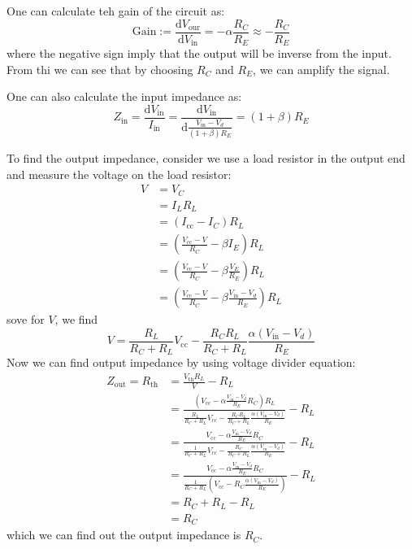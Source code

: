 \documentclass[aps,prl,reprint]{revtex4-1}
\newcommand{\de}{\mathrm{d}}
\newcommand{\vcc}{V_\text{cc}}
\begin{document}
One can calculate teh gain of the circuit as:
\begin{equation*}
    \text{Gain}:=\frac{\de V_\text{our}}{\de V_\text{in}} = -\alpha\frac{R_C}{R_E} \approx -\frac{R_C}{R_E}
\end{equation*}
where the negative sign imply that the output will be inverse from the input. From thi we can see that by choosing $R_C$ and $R_E$, we can amplify the signal.

One can also calculate the input impedance as:
\[
Z_\text{in} = \frac{\de V_\text{in}}{I_\text{in}}=\frac{\de V_\text{in}}{\de \frac{V_\text{in} - V_d}{(1+\beta)R_E}} = (1+\beta)R_E
\]

To find the output impedance, consider we use a load resistor in the output end and measure the voltage on the load resistor:
\begin{align*}
    V &= V_C\\
      &=I_LR_L \\
      &= (I_\text{cc} - I_C)R_L\\
      &= (\frac{\vcc-V}{R_C}-\beta I_E)R_L\\
      &= (\frac{\vcc-V}{R_C}-\beta \frac{V_E}{R_E})R_L \\
      &= (\frac{\vcc-V}{R_C}-\beta \frac{V_\text{in} - V_d}{R_E})R_L
\end{align*}
sove for $V$, we find
\[
V = \frac{R_L}{R_C+R_L} \vcc - \frac{R_CR_L}{R_C+R_L}\frac{\alpha (V_\text{in}-V_d)}{R_E}
\]
Now we can find output impedance by using voltage divider equation:
\begin{align*}
    Z_\text{out} = R_\text{th} &= \frac{V_\text{th} R_L}{V} - R_L \\
                               &= \frac{(\vcc - \alpha \frac{V_\text{in} - V_d}{R_E}R_C) R_L}{\frac{R_L}{R_C+R_L} \vcc - \frac{R_CR_L}{R_C+R_L}\frac{\alpha (V_\text{in}-V_d)}{R_E}} - R_L\\
                               &= \frac{\vcc - \alpha \frac{V_\text{in} - V_d}{R_E}R_C}{\frac{1}{R_C+R_L} \vcc - \frac{R_C}{R_C+R_L}\frac{\alpha (V_\text{in}-V_d)}{R_E}}- R_L\\
                               &= \frac{\vcc - \alpha \frac{V_\text{in} - V_d}{R_E}R_C}{\frac{1}{R_C+R_L} (\vcc - R_C\frac{\alpha (V_\text{in}-V_d)}{R_E})}- R_L\\
                               &=R_C + R_L - R_L\\
                               &=R_C
\end{align*}
which we can find out the output impedance is $R_C$.
\end{document}
